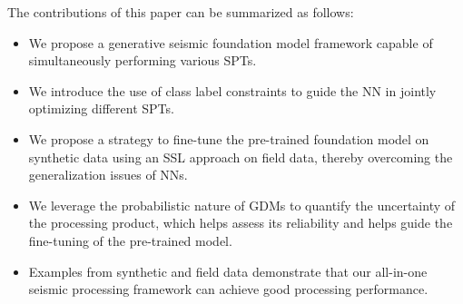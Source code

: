 The contributions of this paper can be summarized as follows:
\begin{itemize}
   \item We propose a generative seismic foundation model framework capable of simultaneously performing various SPTs.
   \item We introduce the use of class label constraints to guide the NN in jointly optimizing different SPTs.
   \item We propose a strategy to fine-tune the pre-trained foundation model on synthetic data using an SSL approach on field data, thereby overcoming the generalization issues of NNs.
   \item We leverage the probabilistic nature of GDMs to quantify the uncertainty of the processing product, which helps assess its reliability and helps guide the fine-tuning of the pre-trained model.
   \item Examples from synthetic and field data demonstrate that our all-in-one seismic processing framework can achieve good processing performance.
\end{itemize} 






